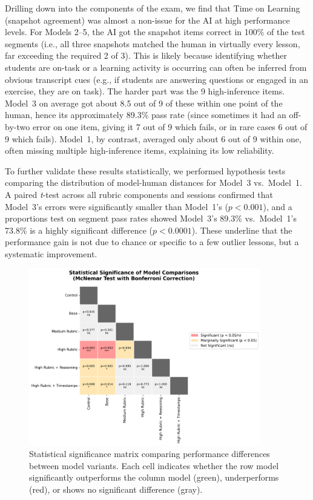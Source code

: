 \documentclass[12pt]{article}
\begin{document}
Drilling down into the components of the exam, we find that Time on Learning (snapshot agreement) was almost a non-issue for the AI at high performance levels. For Models 2–5, the AI got the snapshot items correct in 100\% of the test segments (i.e., all three snapshots matched the human in virtually every lesson, far exceeding the required 2 of 3). This is likely because identifying whether students are on-task or a learning activity is occurring can often be inferred from obvious transcript cues (e.g., if students are answering questions or engaged in an exercise, they are on task). The harder part was the 9 high-inference items. Model~3 on average got about 8.5 out of 9 of these within one point of the human, hence its approximately 89.3\% pass rate (since sometimes it had an off-by-two error on one item, giving it 7 out of 9 which fails, or in rare cases 6 out of 9 which fails). Model~1, by contrast, averaged only about 6 out of 9 within one, often missing multiple high-inference items, explaining its low reliability.

To further validate these results statistically, we performed hypothesis tests comparing the distribution of model-human distances for Model~3 vs.\ Model~1. A paired \textit{t}-test across all rubric components and sessions confirmed that Model~3's errors were significantly smaller than Model~1's (\(p < 0.001\)), and a proportions test on segment pass rates showed Model~3's 89.3\% vs.\ Model~1's 73.8\% is a highly significant difference (\(p < 0.0001\)). These underline that the performance gain is not due to chance or specific to a few outlier lessons, but a systematic improvement.

\begin{figure}[H]\centering
\includegraphics[width=0.9\textwidth]{statistical_significance_matrix.png}
\caption{Statistical significance matrix comparing performance differences between model variants. Each cell indicates whether the row model significantly outperforms the column model (green), underperforms (red), or shows no significant difference (gray).}
\label{fig:stat-sig}
\end{figure}
\end{document}
